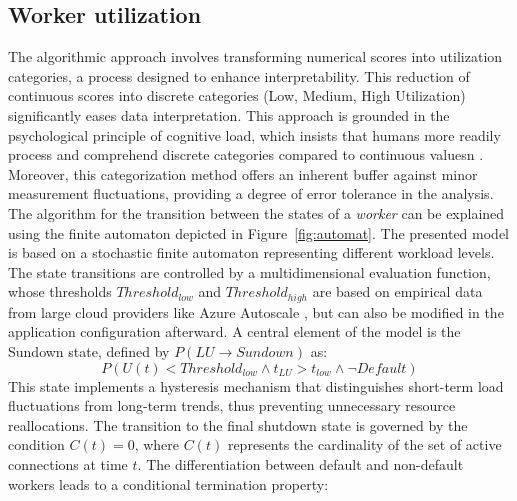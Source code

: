 \documentclass[twocolumn]{webofc}
\begin{document}
\subsection{Worker utilization}
The algorithmic approach involves transforming numerical scores into utilization categories, a process designed to enhance interpretability. This reduction of continuous scores into discrete categories (Low, Medium, High Utilization) significantly eases data interpretation. This approach is grounded in the psychological principle of cognitive load, which insists that humans more readily process and comprehend discrete categories compared to continuous valuesn \cite{cogload}. Moreover, this categorization method offers an inherent buffer against minor measurement fluctuations, providing a degree of error tolerance in the analysis. The algorithm for the transition between the states of a \textit{worker} can be explained using the finite automaton depicted in Figure~\ref{fig:automat}. The presented model is based on a stochastic finite automaton representing different workload levels. The state transitions are controlled by a multidimensional evaluation function, whose thresholds $Threshold_{low}$ and $Threshold_{high}$ are based on empirical data from large cloud providers like Azure Autoscale \cite{azure_autoscale_best_practices}, but can also be modified in the application configuration afterward. A central element of the model is the Sundown state, defined by \( P(LU \rightarrow Sundown) \) as:
$$P(U(t) < Threshold_{low} \wedge t_{LU} > t_{low} \wedge \neg Default) $$
This state implements a hysteresis mechanism that distinguishes short-term load fluctuations from long-term trends, thus preventing unnecessary resource reallocations. The transition to the final shutdown state is governed by the condition $C(t) = 0$, where $C(t)$ represents the cardinality of the set of active connections at time $t$. The differentiation between default and non-default workers leads to a conditional termination property:
\end{document}
